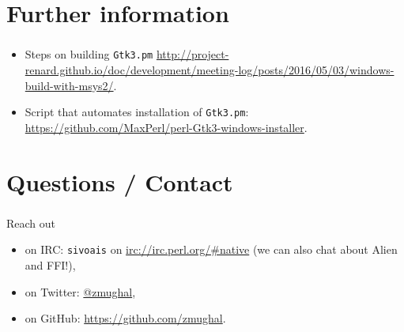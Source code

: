\documentclass{beamer}
\begin{document}
\section{Further information}
\begin{frame}\frametitle{\secname}
	\begin{itemize}
		\item Steps on building \texttt{Gtk3.pm}
			\url{http://project-renard.github.io/doc/development/meeting-log/posts/2016/05/03/windows-build-with-msys2/}.
		\item Script that automates installation of
			\texttt{Gtk3.pm}: \url{https://github.com/MaxPerl/perl-Gtk3-windows-installer}.
	\end{itemize}
\end{frame}


\section{Questions / Contact}
\begin{frame}\frametitle{\secname}
Reach out
\begin{itemize}
	\item on IRC: \texttt{sivoais} on \url{irc://irc.perl.org/#native} (we can also chat
		about Alien and FFI!),
	\item on Twitter: \href{https://twitter.com/zmughal}{@zmughal},
	\item on GitHub: \url{https://github.com/zmughal}.
\end{itemize}
\end{frame}



\end{document}
